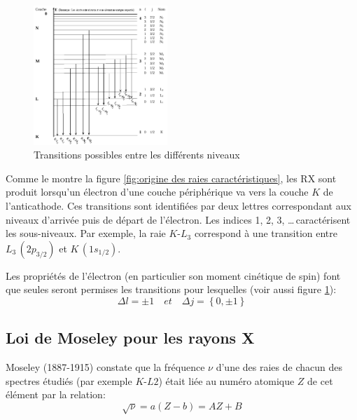 \documentclass{article}
\begin{document}
\setlength{\intextsep}{0pt}
\begin{figure}
    \centering
    \vspace{-1.5cm}
    \includegraphics[width=0.45\textwidth]{Fig/Grotrian-RX.png} 
    \caption{Transitions possibles entre les différents niveaux}
    \label{fig:Transitions possibles}
\end{figure}
\vspace{5mm}
Comme le montre la figure \ref{fig:origine des raies caractéristiques}, 
les RX sont produit lorsqu'un électron d'une couche périphérique va vers la couche $K$ de l'anticathode. 
Ces transitions sont identifiées par deux lettres correspondant aux niveaux d'arrivée puis de départ de l'électron. 
Les indices 1, 2, 3, \dots \,caractérisent les sous-niveaux. 
Par exemple, la raie $K\text{-}L_3$ correspond à une transition entre $L_3\, (2p_{3/2})$ et $K\, (1s_{1/2})$. 

Les propriétés de l'électron (en particulier son moment cinétique de spin) font que seules seront permises 
les transitions pour lesquelles (voir aussi figure \ref{fig:Transitions possibles}):
$$\boxed{\Delta l = \pm 1 \quad et \quad \Delta j = \left\{0, \pm 1\right\}}$$  


\clearpage

\subsection{Loi de Moseley pour les rayons X}

Moseley (1887-1915) constate que la fréquence $\nu$ d'une des raies de chacun des 
spectres étudiés (par exemple $K$-$L2$) était liée au numéro atomique $Z$ de cet élément par 
la relation:
$$\sqrt{\nu}=a(Z-b)=AZ+B$$
\end{document}
